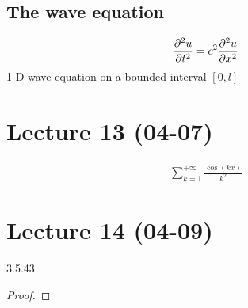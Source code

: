 \subsection{The wave equation}
\begin{equation}
    \label{eq:4.3} \pdv[2]{u}{t}=c^2\pdv[2]{u}{x}
\end{equation}
1-D wave equation on a bounded interval $ [0,l] $ 
\section{Lecture 13 (04-07)}
\begin{align*}{}{}
\sum_{k=1}^{+\infty}\frac{\cos(kx)}{k^2}
\end{align*}
\section{Lecture 14 (04-09)}
3.5.43
\begin{proof}
\end{proof}
